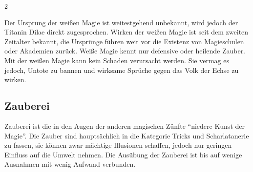 \begin{multicols}{2}
{Der Ursprung der weißen Magie ist weitestgehend unbekannt, wird jedoch der Titanin Dilae direkt zugesprochen.
Wirken der weißen Magie ist seit dem zweiten Zeitalter bekannt, die Ursprünge führen weit vor die Existenz von Magieschulen oder Akademien zurück.
Weiße Magie kennt nur defensive oder heilende Zauber.
Mit der weißen Magie kann kein Schaden verursacht werden.
Sie vermag es jedoch, Untote zu bannen und wirksame Sprüche gegen das Volk der Echse zu wirken.

\subsection{Zauberei}\label{subsec:zauberei}

Zauberei ist die in den Augen der anderen magischen Zünfte ``niedere Kunst der Magie''.
Die Zauber sind hauptsächlich in die Kategorie Tricks und Scharlatanerie zu fassen, sie können zwar mächtige Illusionen schaffen, jedoch nur geringen Einfluss auf die Umwelt nehmen.
Die Ausübung der Zauberei ist bis auf wenige Ausnahmen mit wenig Aufwand verbunden.

}{}
\end{multicols}
